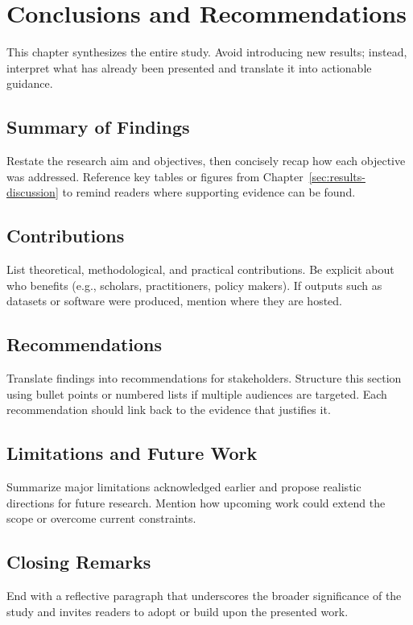 \section{Conclusions and Recommendations}
\label{sec:conclusion}

\noindent This chapter synthesizes the entire study. Avoid introducing new
results; instead, interpret what has already been presented and translate it into
actionable guidance.

\subsection{Summary of Findings}
Restate the research aim and objectives, then concisely recap how each
objective was addressed. Reference key tables or figures from
Chapter~\ref{sec:results-discussion} to remind readers where supporting
evidence can be found.

\subsection{Contributions}
List theoretical, methodological, and practical contributions. Be explicit
about who benefits (e.g., scholars, practitioners, policy makers). If outputs
such as datasets or software were produced, mention where they are hosted.

\subsection{Recommendations}
Translate findings into recommendations for stakeholders. Structure this
section using bullet points or numbered lists if multiple audiences are
targeted. Each recommendation should link back to the evidence that justifies
it.

\subsection{Limitations and Future Work}
Summarize major limitations acknowledged earlier and propose realistic
directions for future research. Mention how upcoming work could extend the
scope or overcome current constraints.

\subsection{Closing Remarks}
End with a reflective paragraph that underscores the broader significance of
the study and invites readers to adopt or build upon the presented work.
